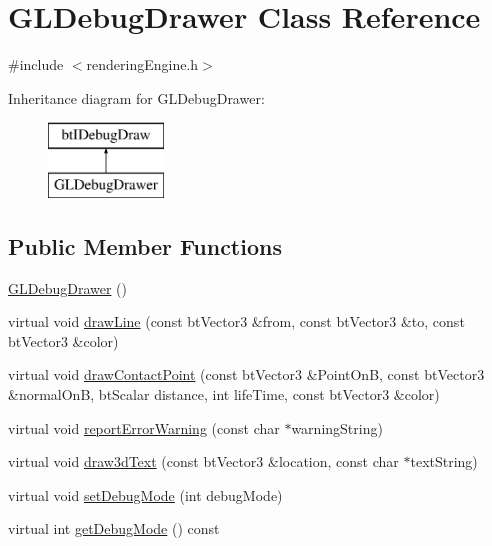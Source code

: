 \hypertarget{class_g_l_debug_drawer}{}\section{G\+L\+Debug\+Drawer Class Reference}
\label{class_g_l_debug_drawer}


{\ttfamily \#include $<$rendering\+Engine.\+h$>$}

Inheritance diagram for G\+L\+Debug\+Drawer\+:\begin{figure}[H]
\begin{center}
\leavevmode
\includegraphics[height=2.000000cm]{class_g_l_debug_drawer}
\end{center}
\end{figure}
\subsection*{Public Member Functions}
\begin{DoxyCompactItemize}
\item 
\hyperlink{class_g_l_debug_drawer_abb8d86c1187b073736b72c45c748a552}{G\+L\+Debug\+Drawer} ()
\item 
virtual void \hyperlink{class_g_l_debug_drawer_a4f37715bd5fbec4eae17285bcd3024ad}{draw\+Line} (const bt\+Vector3 \&from, const bt\+Vector3 \&to, const bt\+Vector3 \&color)
\item 
virtual void \hyperlink{class_g_l_debug_drawer_aa2373d114bd57438ae3eb7319d6052f2}{draw\+Contact\+Point} (const bt\+Vector3 \&Point\+On\+B, const bt\+Vector3 \&normal\+On\+B, bt\+Scalar distance, int life\+Time, const bt\+Vector3 \&color)
\item 
virtual void \hyperlink{class_g_l_debug_drawer_a4bd03c9b18d0359dfd6d3e9450e327f8}{report\+Error\+Warning} (const char $\ast$warning\+String)
\item 
virtual void \hyperlink{class_g_l_debug_drawer_a6325861596594c1f8df946cef3d14194}{draw3d\+Text} (const bt\+Vector3 \&location, const char $\ast$text\+String)
\item 
virtual void \hyperlink{class_g_l_debug_drawer_a91f3d38a8253603e41f8a9148f37dd9a}{set\+Debug\+Mode} (int debug\+Mode)
\item 
virtual int \hyperlink{class_g_l_debug_drawer_a54af9866c8b723c08b961cf2e7905481}{get\+Debug\+Mode} () const 
\end{DoxyCompactItemize}


